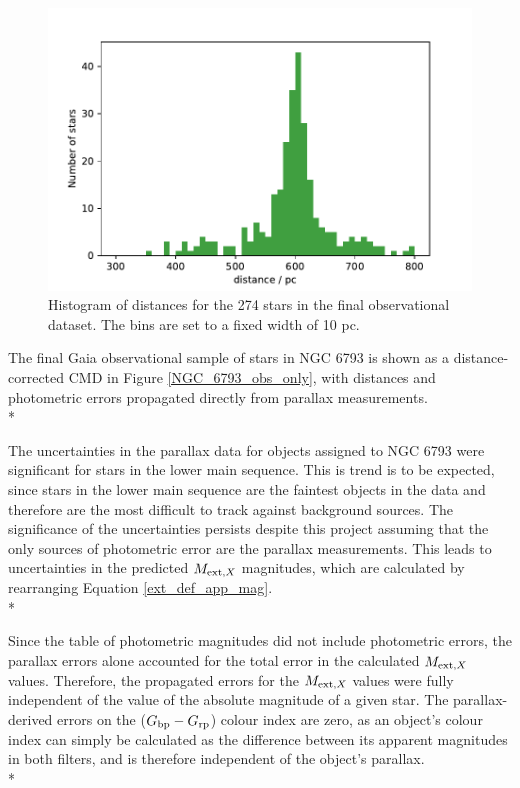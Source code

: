 \documentclass[12pt, a4paper]{report}
\begin{document}
\begin{figure}[h]
\begin{center}
\includegraphics[width=1.0\textwidth]{../NGC_6793_distances_hist.pdf}
\caption{Histogram of distances for the 274 stars in the final observational dataset. The bins are set to a fixed width of 10 pc.}
\label{NGC_6793_dist_hist}
\end{center}
\end{figure}

The final Gaia observational sample of stars in NGC 6793 is shown as a distance-corrected CMD in Figure \ref{NGC_6793_obs_only}, with distances and photometric errors propagated directly from parallax measurements.\\*

The uncertainties in the parallax data for objects assigned to NGC 6793 were significant for stars in the lower main sequence. This is trend is to be expected, since stars in the lower main sequence are the faintest objects in the data and therefore are the most difficult to track against background sources. The significance of the uncertainties persists despite this project assuming that the only sources of photometric error are the parallax measurements. This leads to uncertainties in the predicted $M_{\textnormal{ext},X}$ magnitudes, which are calculated by rearranging Equation \ref{ext_def_app_mag}.\\*

Since the table of photometric magnitudes did not include photometric errors, the parallax errors alone accounted for the total error in the calculated $M_{\textnormal{ext},X}$ values. Therefore, the propagated errors for the $M_{\textnormal{ext},X}$ values were fully independent of the value of the absolute magnitude of a given star. The parallax-derived errors on the ($G_{\textnormal{bp}}-G_{\textnormal{rp}}$) colour index are zero, as an object's colour index can simply be calculated as the difference between its apparent magnitudes in both filters, and is therefore independent of the object's parallax.\\*
\end{document}
